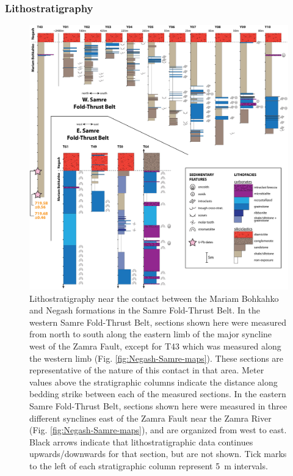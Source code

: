\subsubsection{Lithostratigraphy}

\begin{figure}[!htbp]
\begin{center}
	\includegraphics[width=\textwidth]{figures/Tambien/Sturtian-onset.pdf}
	\caption[Lithostratigraphy near the contact between the Mariam Bohkahko and Negash formations.]{Lithostratigraphy near the contact between the Mariam Bohkahko and Negash formations in the Samre Fold-Thrust Belt. In the western Samre Fold-Thrust Belt, sections shown here were measured from north to south along the eastern limb of the major syncline west of the Zamra Fault, except for T43 which was measured along the western limb (Fig. \ref{fig:Negash-Samre-maps}). These sections are representative of the nature of this contact in that area. Meter values above the stratigraphic columns indicate the distance along bedding strike between each of the measured sections. In the eastern Samre Fold-Thrust Belt, sections shown here were measured in three different synclines east of the Zamra Fault near the Zamra River (Fig. \ref{fig:Negash-Samre-maps}), and are organized from west to east. Black arrows indicate that lithostratigraphic data continues upwards/downwards for that section, but are not shown. Tick marks to the left of each stratigraphic column represent 5~m intervals.}
	\label{fig:Sturtian-onset}
\end{center}
\end{figure}

